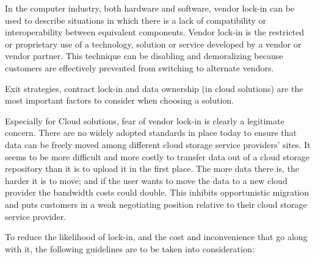 In the computer industry, both hardware and software, vendor lock-in can
be used to describe situations in which there is a lack of compatibility
or interoperability between equivalent components. Vendor lock-in is the
restricted or proprietary use of a technology, solution or service
developed by a vendor or vendor partner. This technique can be disabling
and demoralizing because customers are effectively prevented from
switching to alternate vendors.

Exit strategies, contract lock-in and data ownership (in cloud
solutions) are the most important factors to consider when choosing a
solution. %

Especially for Cloud solutions, fear of vendor lock-in is clearly a
legitimate concern. There are no widely adopted standards in place today
to ensure that data can be freely moved among different cloud storage
service providers' sites. It seems to be more difficult and more costly
to transfer data out of a cloud storage repository than it is to upload
it in the first place. The more data there is, the harder it is to move;
and if the user wants to move the data to a new cloud provider the
bandwidth costs could double. This inhibits opportunistic migration and
puts customers in a weak negotiating position relative to their cloud
storage service provider.

To reduce the likelihood of lock-in, and the cost and inconvenience that
go along with it, the following guidelines are to be taken into
consideration:

